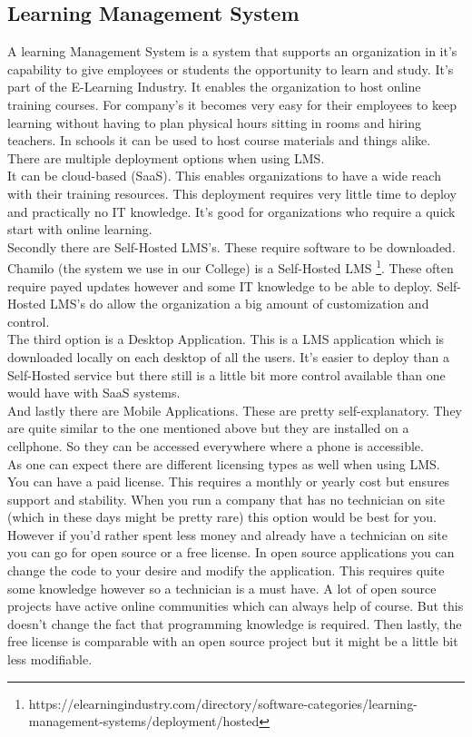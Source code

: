 \subsection{Learning Management System}
A learning Management System is a system that supports an organization in it's capability to give employees or students the opportunity to learn and study. It's part of the E-Learning Industry. It enables the organization to host online training courses. For company's it becomes very easy for their employees to keep learning without having to plan physical hours sitting in rooms and hiring teachers. In schools it can be used to host course materials and things alike. There are multiple deployment options when using LMS. \\
It can be cloud-based (SaaS). This enables organizations to have a wide reach with their training resources. This deployment requires very little time to deploy and practically no IT knowledge. It's good for organizations who require a quick start with online learning.\\
Secondly there are Self-Hosted LMS's. These require software to be downloaded. Chamilo (the system we use in our College) is a Self-Hosted LMS \footnote{https://elearningindustry.com/directory/software-categories/learning-management-systems/deployment/hosted}. These often require payed updates however and some IT knowledge to be able to deploy. Self-Hosted LMS's do allow the organization a big amount of customization and control.\\
The third option is a Desktop Application. This is a LMS application which is downloaded locally on each desktop of all the users. It's easier to deploy than a Self-Hosted service but there still is a little bit more control available than one would have with SaaS systems.\\
And lastly there are Mobile Applications. These are pretty self-explanatory. They are quite similar to the one mentioned above but they are installed on a cellphone. So they can be accessed everywhere where a phone is accessible.\\
As one can expect there are different licensing types as well when using LMS. You can have a paid license. This requires a monthly or yearly cost but ensures support and stability. When you run a company that has no technician on site (which in these days might be pretty rare) this option would be best for you. However if you'd rather spent less money and already have a technician on site you can go for open source or a free license. In open source applications you can change the code to your desire and modify the application. This requires quite some knowledge however so a technician is a must have. A lot of open source projects have active online communities which can always help of course. But this doesn't change the fact that programming knowledge is required. Then lastly, the free license is comparable with an open source project but it might be a little bit less modifiable.\\

